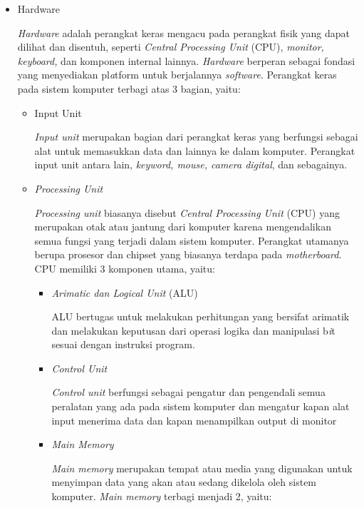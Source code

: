 \documentclass[12pt]{article}
\begin{document}
    \begin{itemize}
        \item Hardware
        \par
        \textit{Hardware} adalah perangkat keras mengacu pada perangkat fisik yang dapat dilihat dan disentuh, seperti \textit{Central Processing Unit }(CPU), \textit{monitor, keyboard,} dan komponen internal lainnya.\textit{ Hardware} berperan sebagai fondasi yang menyediakan pl\textit{a}tform untuk berjalannya \textit{software}. Perangkat keras pada sistem komputer terbagi atas 3 bagian, yaitu:
        \begin{itemize}
            \item Input Unit
            \par 
            \textit{Input unit} merupakan bagian dari perangkat keras yang berfungsi sebagai alat untuk memasukkan data dan lainnya ke dalam komputer. Perangkat input unit antara lain, \textit{keyword, mouse, camera digital}, dan sebagainya.
            \item \textit{Processing Unit}
            \par
            \textit{Processing unit} biasanya disebut \textit{Central Processing Unit} (CPU) yang merupakan otak atau jantung dari komputer karena mengendalikan semua fungsi yang terjadi dalam sistem komputer. Perangkat utamanya berupa prosesor dan chipset yang biasanya terdapa pada \textit{motherboard}. CPU memiliki 3 komponen utama, yaitu:
            \begin{itemize}
                \item \textit{Arimatic dan Logical Unit} (ALU)
                \par
                ALU bertugas untuk melakukan perhitungan yang bersifat arimatik dan melakukan keputusan dari operasi logika dan manipulasi b\textit{i}t sesuai dengan instruksi program.
                \item \textit{Control Unit}
                \par
                \textit{Control unit} berfungsi sebagai pengatur dan pengendali semua peralatan yang ada pada sistem komputer dan mengatur kapan alat input menerima data dan kapan menampilkan output di monitor
                \item \textit{Main Memory}
                \par
               \textit{ Main memory} merupakan tempat atau media yang digunakan untuk menyimpan data yang akan atau sedang dikelola oleh sistem komputer. \textit{Main memory } terbagi menjadi 2, yaitu:

\end{itemize}
\end{itemize}
\end{itemize}
\end{document}

